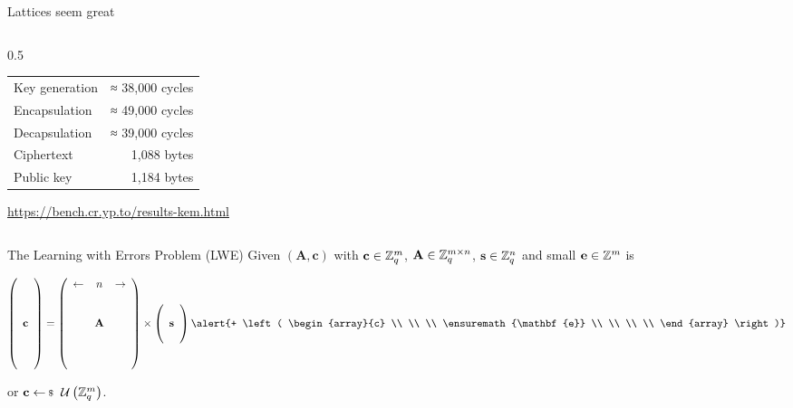 \documentclass[xcolor=table,10pt,aspectratio=169]{beamer}
\renewcommand{\vec}[1]{\ensuremath{\mathbf{#1}}\xspace}
\begin{document}
\begin{frame}[label={sec:orgf68d090}]{Lattices seem great}
\begin{columns}[t]
\begin{column}{0.5\columnwidth}
\begin{center}
\begin{tabular}{lr}
\toprule
Key generation & ≈  38,000 cycles\\
Encapsulation & ≈  49,000 cycles\\
Decapsulation & ≈  39,000 cycles\\
Ciphertext & 1,088 bytes\\
Public key & 1,184 bytes\\
\bottomrule
\end{tabular}

\end{center}

\tiny \url{https://bench.cr.yp.to/results-kem.html}
\end{column}
\end{columns}
\end{frame}
\begin{frame}[label={sec:orgc16c22d}]{The Learning with Errors Problem (LWE)}
Given \((\vec{A},\vec{c})\) with \(\vec{c} \in \ZZ_q^{m}\), \(\vec{A} \in \ZZ_q^{m \times n}\), \(\vec{s} \in \ZZ_q^{n}\) and \alert{small \(\vec{e} \in \ZZ^{m}\)} is

\begin{align*}
\left(\begin{array}{c}
\\
\\
\\ 
\vec{c} \\
\\
\\
\\
\end{array} \right) = \left(
\begin{array}{ccc}
\leftarrow & n & \rightarrow \\
\\
\\ 
& \vec{A} & \\
\\
\\
\\
\end{array} \right) \times \left( \begin{array}{c}
\\
\vec{s} \\
\\
\end{array} \right) \alert{+ \left(
\begin{array}{c}
\\
\\
\\ 
\vec{e} \\
\\
\\
\\
\end{array} 
\right)}
\end{align*}

or \(\vec{c} \sample \mathcal{U}\left(\ZZ_q^{m}\right)\).
\end{frame}
\end{document}
